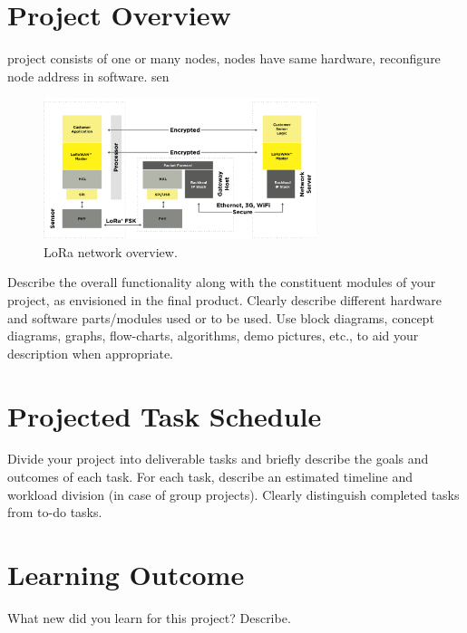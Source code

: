 \documentclass{IEEEtran}
\begin{document}
\section{Project Overview} 


project consists of one or many nodes, nodes have same hardware, reconfigure node address in software. sen

\begin{figure}[h!]
    \centering
    \includegraphics[width=8cm]{images/lorasystem}
    \caption{LoRa network overview.}
    \label{fig:lora_overview}
\end{figure}


Describe the overall functionality along with the constituent modules of your project, as envisioned in the final product. Clearly describe different hardware and software parts/modules used or to be used. Use block diagrams, concept diagrams, graphs, flow-charts, algorithms, demo pictures, etc., to aid your description when appropriate.

\section{Projected Task Schedule} 
Divide your project into deliverable tasks and briefly describe the goals and outcomes of each task. For each task, describe an estimated timeline and workload division (in case of group projects). Clearly distinguish completed tasks from to-do tasks.

\section{Learning Outcome}

What new did you learn for this project? Describe.





\end{document}
